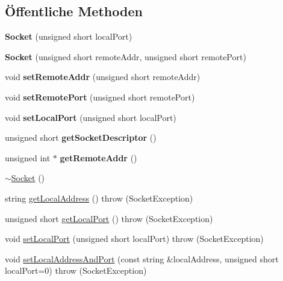 \subsection*{Öffentliche Methoden}
\begin{DoxyCompactItemize}
\item 
\hypertarget{classSocket_ad585c3f2a21f2511a5dea235923c59ee}{{\bfseries Socket} (unsigned short local\-Port)}\label{classSocket_ad585c3f2a21f2511a5dea235923c59ee}

\item 
\hypertarget{classSocket_a32ef908835f62b11ba5b86c18a0bfe28}{{\bfseries Socket} (unsigned short remote\-Addr, unsigned short remote\-Port)}\label{classSocket_a32ef908835f62b11ba5b86c18a0bfe28}

\item 
\hypertarget{classSocket_a2d8cf63685c29463181d8e5536e0f3cc}{void {\bfseries set\-Remote\-Addr} (unsigned short remote\-Addr)}\label{classSocket_a2d8cf63685c29463181d8e5536e0f3cc}

\item 
\hypertarget{classSocket_a54dd43a68403812d58ea9e2e8024cf45}{void {\bfseries set\-Remote\-Port} (unsigned short remote\-Port)}\label{classSocket_a54dd43a68403812d58ea9e2e8024cf45}

\item 
\hypertarget{classSocket_a773fe4a35146002de76952e16fdebcfa}{void {\bfseries set\-Local\-Port} (unsigned short local\-Port)}\label{classSocket_a773fe4a35146002de76952e16fdebcfa}

\item 
\hypertarget{classSocket_a2bcd6d8cca7a9dfd88b3101732d0abcc}{unsigned short {\bfseries get\-Socket\-Descriptor} ()}\label{classSocket_a2bcd6d8cca7a9dfd88b3101732d0abcc}

\item 
\hypertarget{classSocket_a5774a66b0f9d58380bf248c08c0dd33c}{unsigned int $\ast$ {\bfseries get\-Remote\-Addr} ()}\label{classSocket_a5774a66b0f9d58380bf248c08c0dd33c}

\item 
\hyperlink{classSocket_aeac4eb6379a543d38ed88977d3b6630a}{$\sim$\-Socket} ()
\item 
string \hyperlink{classSocket_a0fca07bdfa97874fba1a17995ed7cda3}{get\-Local\-Address} ()  throw (\-Socket\-Exception)
\item 
unsigned short \hyperlink{classSocket_ae01143b667d69483a2f53d0f4ce7eeed}{get\-Local\-Port} ()  throw (\-Socket\-Exception)
\item 
void \hyperlink{classSocket_a773fe4a35146002de76952e16fdebcfa}{set\-Local\-Port} (unsigned short local\-Port)  throw (\-Socket\-Exception)
\item 
void \hyperlink{classSocket_aa6b986410bc2e606ba27d01fa7cb8836}{set\-Local\-Address\-And\-Port} (const string \&local\-Address, unsigned short local\-Port=0)  throw (\-Socket\-Exception)
\end{DoxyCompactItemize}

